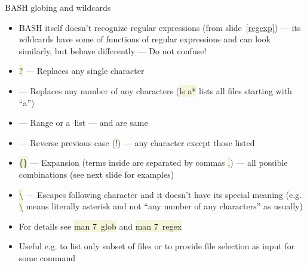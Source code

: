 \documentclass[compress, xelatex, 11pt, xcolor=svgnames, aspectratio=169,
	hyperref={
		bookmarks=true,
		unicode=true,
		colorlinks=true,
		pdftitle={Linux, command line and MetaCentrum},
		plainpages=false,
		pdfauthor={Vojtech Zeisek},
		pdfsubject={Course about use of Linux command line, writing shell scripts and using MetaCentrum of CESNET},
		pdfcreator={XeLaTeX},
		pdfkeywords={Linux, GNU, BASH, shell, command line, MetaCentrum},
		linkcolor=DarkRed, %
		anchorcolor=DarkBlue, %
		citecolor=Indigo, %
		filecolor=NavyBlue, %
		menucolor=DarkMagenta, %
		urlcolor=DarkBlue, %
		},
	url={hyphens, lowtilde} %
	]{beamer}
\renewcommand{\texttt}[1]{\colorbox{Beige}{{\ttfamily #1}}}
\begin{document}
\begin{frame}{BASH globing and wildcards}
	\label{globbing}
	\begin{itemize}
		\item BASH itself doesn't recognize regular expressions (from slide~\ref{regexp}) --- its wildcards have some of functions of regular expressions and can look similarly, but behave differently --- Do not confuse!
		\item \texttt{?} --- Replaces any single character
		\item \texttt{*} --- Replaces any number of any characters (\texttt{ls a*} lists all files starting with \enquote{a})
		\item \texttt{[]} --- Range or a~list --- \texttt{[abcdef]} and \texttt{[a-f]} are same
		\item \texttt{[!\ldots]} --- Reverse previous case (\texttt{!}) --- any character except those listed
		\item \texttt{\{\}} --- Expansion (terms inside are separated by commas \texttt{,}) --- all possible combinations (see next slide for examples)
		\item \texttt{\textbackslash} --- Escapes following character and it doesn't have its special meaning (e.g. \texttt{\textbackslash *} means literally asterisk \texttt{*} and not \enquote{any number of any characters} as usually)
		\item For details see \texttt{man 7~glob} and \texttt{man 7~regex}
		\item Useful e.g. to list only subset of files or to provide file selection as input for some command
	\end{itemize}
\end{frame}
\end{document}
